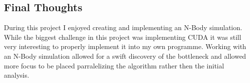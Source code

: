 \documentclass[12pt]{article}
\begin{document}
\subsection{Final Thoughts}
During this project I enjoyed creating and implementing an N-Body simulation. While the biggest challenge in this project was implementing CUDA it was still very interesting to properly implement it into my own programme. Working with an N-Body simulation allowed for a swift discovery of the bottleneck and allowed more focus to be placed parralelizing the algorithm rather then the initial analysis. 

	
\end{document}
